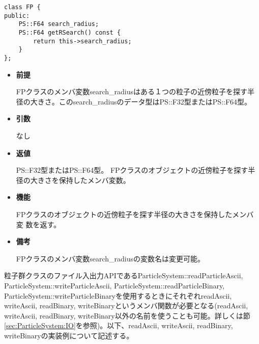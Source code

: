 

\begin{screen}
\begin{verbatim}
class FP {
public:
    PS::F64 search_radius;
    PS::F64 getRSearch() const {
        return this->search_radius;
    }
};
\end{verbatim}
\end{screen}

\begin{itemize}

\item {\bf 前提}

  FPクラスのメンバ変数search\_radiusはある１つの粒子の近傍粒子を探す半
  径の大きさ。このsearch\_radiusのデータ型はPS::F32型またはPS::F64型。
  
\item {\bf 引数}

  なし
  
\item {\bf 返値}

  PS::F32型またはPS::F64型。 FPクラスのオブジェクトの近傍粒子を探す半
  径の大きさを保持したメンバ変数。
  
\item {\bf 機能}

  FPクラスのオブジェクトの近傍粒子を探す半径の大きさを保持したメンバ変
  数を返す。

\item {\bf 備考}

  FPクラスのメンバ変数search\_radiusの変数名は変更可能。
  
\end{itemize}

\label{sec:example_userdefined_fullparticle_io}

粒子群クラスのファイル入出力APIであるParticleSystem::readParticleAscii, ParticleSystem::writeParticleAscii, ParticleSystem::readParticleBinary, ParticleSystem::writeParticleBinaryを使用するときにそれぞれreadAscii, writeAscii, readBinary, writeBinaryというメンバ関数が必要となる(readAscii, writeAscii, readBinary, writeBinary以外の名前を使うことも可能。詳しくは節\ref{sec:ParticleSystem:IO}を参照)。以下、readAscii, writeAscii, readBinary, writeBinaryの実装例について記述する。


